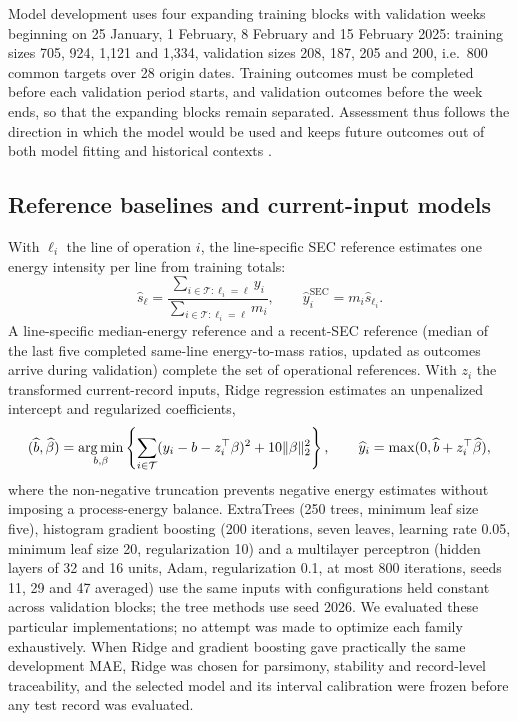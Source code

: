 Model development uses four expanding training blocks with validation weeks beginning on 25 January, 1 February, 8 February and 15 February 2025: training sizes 705, 924, 1,121 and 1,334, validation sizes 208, 187, 205 and 200, i.e.\ 800 common targets over 28 origin dates. Training outcomes must be completed before each validation period starts, and validation outcomes before the week ends, so that the expanding blocks remain separated. Assessment thus follows the direction in which the model would be used and keeps future outcomes out of both model fitting and historical contexts \citep{tashman2000,cerqueira2020,bergmeir2018,kapoor2023}.

\subsection{Reference baselines and current-input models}
With $\ell_i$ the line of operation $i$, the line-specific SEC reference estimates one energy intensity per line from training totals:
\begin{equation}
 \widehat{s}_\ell=\frac{\sum_{i\in\mathcal T:\ell_i=\ell}y_i}{\sum_{i\in\mathcal T:\ell_i=\ell}m_i},
 \qquad \widehat y_i^{\mathrm{SEC}}=m_i\widehat s_{\ell_i}.
 \label{eq:sec}
\end{equation}
A line-specific median-energy reference and a recent-SEC reference (median of the last five completed same-line energy-to-mass ratios, updated as outcomes arrive during validation) complete the set of operational references. With $z_i$ the transformed current-record inputs, Ridge regression estimates an unpenalized intercept and regularized coefficients,
\begin{equation}
 (\widehat b,\widehat\beta)=\operatorname*{arg\,min}_{b,\beta}
 \left\{\sum_{i\in\mathcal T}(y_i-b-z_i^\top\beta)^2+10\|\beta\|_2^2\right\},
 \qquad \widehat y_i=\max(0,\widehat b+z_i^\top\widehat\beta),
 \label{eq:ridge}
\end{equation}
where the non-negative truncation prevents negative energy estimates without imposing a process-energy balance. ExtraTrees (250 trees, minimum leaf size five), histogram gradient boosting (200 iterations, seven leaves, learning rate 0.05, minimum leaf size 20, regularization 10) and a multilayer perceptron (hidden layers of 32 and 16 units, Adam, regularization 0.1, at most 800 iterations, seeds 11, 29 and 47 averaged) use the same inputs with configurations held constant across validation blocks; the tree methods use seed 2026. We evaluated these particular implementations; no attempt was made to optimize each family exhaustively. When Ridge and gradient boosting gave practically the same development MAE, Ridge was chosen for parsimony, stability and record-level traceability, and the selected model and its interval calibration were frozen before any test record was evaluated.

